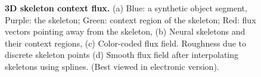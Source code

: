 \begin{figure}[t]
\begin{subfigure}[c]{0.15\textwidth}
		\caption{\label{fig::context_field_directions_d}}
	\end{subfigure}
	\hfill\null
	\caption{{\bf 3D skeleton context flux.} (a) Blue: a synthetic object segment, Purple: the skeleton; Green: context region of the skeleton; Red: flux vectors pointing away from the skeleton, (b) Neural skeletons and their context regions, (c) Color-coded flux field. Roughness due to discrete skeleton points (d) Smooth flux field after interpolating skeletons using splines. (Best viewed in electronic version).}
	\label{fig:context_field_directions}
\end{figure}

